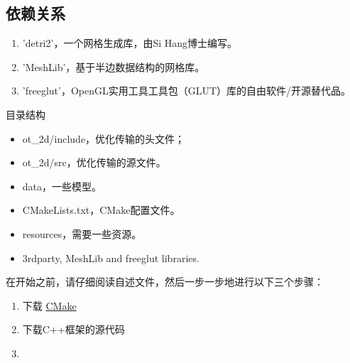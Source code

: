 \subsection{依赖关系}

\begin{enumerate}
    \item 'detri2'，一个网格生成库，由Si Hang博士编写。
    \item 'MeshLib'，基于半边数据结构的网格库。
    \item 'freeglut'，OpenGL实用工具工具包（GLUT）库的自由软件/开源替代品。
\end{enumerate}

目录结构
\begin{itemize}
    \item ot\_2d/include，优化传输的头文件；
    \item ot\_2d/src，优化传输的源文件。
    \item data，一些模型。
    \item CMakeLists.txt，CMake配置文件。
    \item resources，需要一些资源。
    \item 3rdparty, MeshLib and freeglut libraries.
\end{itemize}

在开始之前，请仔细阅读自述文件，然后一步一步地进行以下三个步骤：

\begin{enumerate}
    \item 下载 \href{https://cmake.org/download/}{CMake}
    \item 下载C++框架的源代码
    \item 
\end{enumerate}

